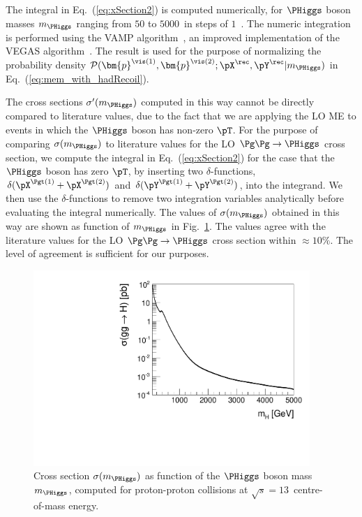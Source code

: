 The integral in Eq.~(\ref{eq:xSection2}) is computed numerically,
for $\PHiggs$ boson masses $m_{\PHiggs}$ ranging from $50$ to $5000$~\GeV in steps of $1$~\GeV.
The numeric integration is performed using the VAMP algorithm~\cite{VAMP},
an improved implementation of the VEGAS algorithm~\cite{VEGAS}.
The result is used for the purpose of normalizing the probability density $\mathcal{P}(\bm{p}^{\vis(1)},\bm{p}^{\vis(2)};\pX^{\rec},\pY^{\rec}|m_{\PHiggs})$
in Eq.~(\ref{eq:mem_with_hadRecoil}).

The cross sections $\sigma'(m_{\PHiggs})$ computed in this way cannot 
be directly compared to literature values,
due to the fact that we are applying the LO ME to events in which the $\PHiggs$ boson has non-zero $\pT$.
For the purpose of comparing $\sigma(m_{\PHiggs})$ to literature
values for the LO $\Pg\Pg \to \PHiggs$ cross section,
we compute the integral in Eq.~(\ref{eq:xSection2}) for the case that the $\PHiggs$ boson has zero $\pT$,
by inserting two $\delta$-functions, $\delta(\pX^{\Pgt(1)} + \pX^{\Pgt(2)})$ and $\delta(\pY^{\Pgt(1)} + \pY^{\Pgt(2)})$, into the integrand.
We then use the $\delta$-functions to remove two integration variables
analytically before evaluating the integral numerically.
The values of $\sigma(m_{\PHiggs})$ obtained in this way are shown as function of
$m_{\PHiggs}$ in Fig.~\ref{fig:xSection}.
The values agree with the literature values for the LO $\Pg\Pg \to
\PHiggs$ cross section within $\approx 10\%$. 
The level of agreement is sufficient for our purposes.

\begin{figure}
\begin{center}
\includegraphics*[height=74mm]{plots/makeSVfitMEM_xSectionPlot_log.pdf}
\end{center}
\caption{
  Cross section $\sigma(m_{\PHiggs})$ as function of the $\PHiggs$ boson mass $m_{\PHiggs}$,
  computed for proton-proton collisions at $\sqrt{s} = 13$~\TeV centre-of-mass energy.
}
\label{fig:xSection}
\end{figure}

